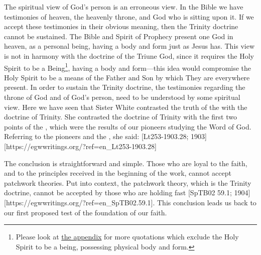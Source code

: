 The spiritual view of God’s person is an erroneous view. In the Bible we have testimonies of heaven, the heavenly throne, and God who is sitting upon it. If we accept these testimonies in their obvious meaning, then the Trinity doctrine cannot be sustained. The Bible and Spirit of Prophecy present one God in heaven, as a personal being, having a body and form just as Jesus has. This view is not in harmony with the doctrine of the Triune God, since it requires the Holy Spirit to be a Being\footnote{Please look at \hyperref[appendix:unauthenticated-reports]{the appendix} for more quotations which exclude the Holy Spirit to be a being, possessing physical body and form.}, having a body and form—this idea would compromise the Holy Spirit to be a means of the Father and Son by which They are everywhere present. In order to sustain the Trinity doctrine, the testimonies regarding the throne of God and of God’s person, need to be understood by some spiritual view. Here we have seen that Sister White contrasted the truth of the  with the doctrine of Trinity. She contrasted the doctrine of Trinity with the first two points of the , which were the results of our pioneers studying the Word of God. Referring to the pioneers and the , she said: [Lt253-1903.28; 1903][https://egwwritings.org/?ref=en\_Lt253-1903.28]

The conclusion is straightforward and simple. Those who are loyal to the faith, and to the principles received in the beginning of the work, cannot accept patchwork theories. Put into context, the patchwork theory, which is the Trinity doctrine, cannot be accepted by those who are holding fast [SpTB02 59.1; 1904][https://egwwritings.org/?ref=en\_SpTB02.59.1]. This conclusion leads us back to our first proposed test of the foundation of our faith.